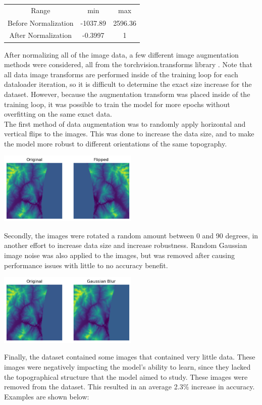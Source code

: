\documentclass{article}[12pt]
\begin{document}
\begin{center}
    \begin{tabular}{|c|c|c|}
        Range & min & max \\
        Before Normalization & -1037.89 & 2596.36 \\
        After Normalization & -0.3997 & 1 \\
    \end{tabular}
\end{center}

\indent
After normalizing all of the image data, a few different image augmentation methods were considered, all from the torchvision.transforms library \cite{transforms}. Note that all data image transforms are performed inside of the training loop for each dataloader iteration, so it is difficult to determine the exact size increase for the dataset. However, because the augmentation transform was placed inside of the training loop, it was possible to train the model for more epochs without overfitting on the same exact data.\\
\indent
The first method of data augmentation was to randomly apply horizontal and vertical flips to the images. This was done to increase the data size, and to make the model more robust to different orientations of the same topography.\\
\begin{center}
    \includegraphics[width=0.5\textwidth]{images/flipped.png}
\end{center}
\indent
Secondly, the images were rotated a random amount between 0 and 90 degrees, in another effort to increase data size and increase robustness. Random Gaussian image noise was also applied to the images, but was removed after causing performance issues with little to no accuracy benefit.\\
\begin{center}
    \includegraphics[width=0.5\textwidth]{images/gauss_blur.png}\\
\end{center}
\indent
Finally, the dataset contained some images that contained very little data. These images were negatively impacting the model's ability to learn, since they lacked the topographical structure that the model aimed to study. These images were removed from the dataset. This resulted in an average 2.3\% increase in accuracy. Examples are shown below:\\
\end{document}
